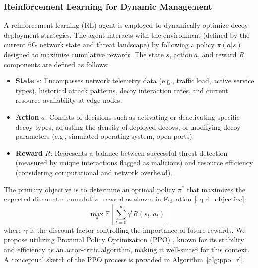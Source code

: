 \documentclass{article}
\begin{document}
\subsubsection{Reinforcement Learning for Dynamic Management}
A reinforcement learning (RL) agent is employed to dynamically optimize decoy deployment strategies. The agent interacts with the environment (defined by the current 6G network state and threat landscape) by following a policy \(\pi(a|s)\) designed to maximize cumulative rewards. The state \(s\), action \(a\), and reward \(R\) components are defined as follows:
\begin{itemize}[label=\textbf{\textbullet}]
    \item \textbf{State} \( s \): Encompasses network telemetry data (e.g., traffic load, active service types), historical attack patterns, decoy interaction rates, and current resource availability at edge nodes.
    \item \textbf{Action} \( a \): Consists of decisions such as activating or deactivating specific decoy types, adjusting the density of deployed decoys, or modifying decoy parameters (e.g., simulated operating system, open ports).
    \item \textbf{Reward} \( R \): Represents a balance between successful threat detection (measured by unique interactions flagged as malicious) and resource efficiency (considering computational and network overhead).
\end{itemize}
The primary objective is to determine an optimal policy \(\pi^*\) that maximizes the expected discounted cumulative reward as shown in Equation~\eqref{eq:rl_objective}:
\begin{equation}
\label{eq:rl_objective}
\max_\pi \mathbb{E} \left[ \sum_{t=0}^{\infty} \gamma^t R(s_t, a_t) \right]
\end{equation}
where \(\gamma\) is the discount factor controlling the importance of future rewards. We propose utilizing Proximal Policy Optimization (PPO) \cite{Yang2023TowardsACK}, known for its stability and efficiency as an actor-critic algorithm, making it well-suited for this context. A conceptual sketch of the PPO process is provided in Algorithm~\ref{alg:ppo_rl}.
\end{document}
